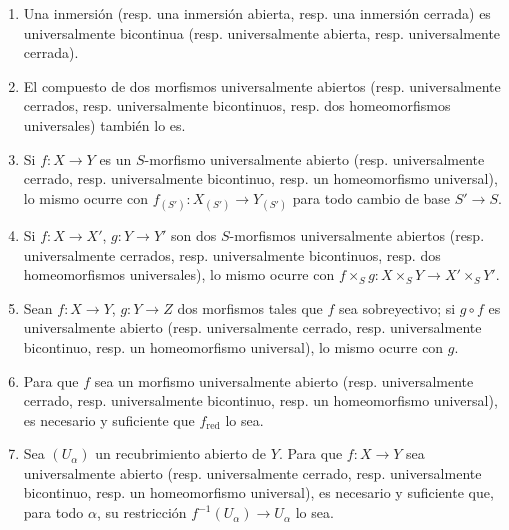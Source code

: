 \begin{proposition}[2.4.3]
\begin{enumerate}
\item[\textup{(i)}] Una inmersión \textup{(resp.} una inmersión abierta, \textup{resp.} una inmersión
cerrada) es universalmente bicontinua \textup{(resp.} universalmente abierta, \textup{resp.}
universalmente cerrada).
\item[\textup{(ii)}] El compuesto de dos morfismos universalmente abiertos \textup{(resp.}
universalmente cerrados, \textup{resp.} universalmente bicontinuos, \textup{resp.} dos
homeomorfismos universales) también lo es.
\item[\textup{(iii)}] Si $f:X\to Y$ es un $S$-morfismo universalmente abierto \textup{(resp.}
universalmente cerrado, \textup{resp.} universalmente bicontinuo, \textup{resp.} un
homeomorfismo universal), lo mismo ocurre con
$f_{(S')}:X_{(S')}\to Y_{(S')}$ para todo cambio de base $S'\to S$.
\item[\textup{(iv)}] Si $f:X\to X'$, $g:Y\to Y'$ son dos $S$-morfismos
universalmente abiertos \textup{(resp.} universalmente cerrados, \textup{resp.} universalmente
bicontinuos, \textup{resp.} dos homeomorfismos universales), lo mismo ocurre con
$f\times_S g:X\times_S Y\to X'\times_S Y'$.
\item[\textup{(v)}] Sean $f:X\to Y$, $g:Y\to Z$ dos morfismos tales que $f$ sea
sobreyectivo; si $g\circ f$ es universalmente abierto \textup{(resp.} universalmente
cerrado, \textup{resp.} universalmente bicontinuo, \textup{resp.} un homeomorfismo universal),
lo mismo ocurre con $g$.
\item[\textup{(vi)}] Para que $f$ sea un morfismo universalmente abierto \textup{(resp.}
universalmente cerrado, \textup{resp.} universalmente bicontinuo, \textup{resp.} un
homeomorfismo universal), es necesario y suficiente que $f_{\mathrm{red}}$ lo
sea.
\item[\textup{(vii)}] Sea $(U_\alpha)$ un recubrimiento abierto de $Y$. Para que
$f:X\to Y$ sea universalmente abierto \textup{(resp.} universalmente cerrado, \textup{resp.}
universalmente bicontinuo, \textup{resp.} un homeomorfismo universal), es necesario y
suficiente que, para todo $\alpha$, su restricción
$f^{-1}(U_\alpha)\to U_\alpha$ lo sea.
\end{enumerate}
\end{proposition}

